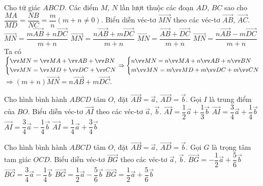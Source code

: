 \begin{ex}%
	Cho tứ giác $ABCD$. Các điểm $M,\,N$ lần lượt thuộc các đoạn $AD,\,BC$ sao cho $\dfrac{MA}{MD}=\dfrac{NB}{NC}=\dfrac{m}{n} (m+n\ne 0)$. Biểu diễn véc-tơ $\vec{MN}$ theo các véc-tơ $\vec{AB},\,\vec{AC}$.
	\haicot
	{$\vec{MN}=\dfrac{m\vec{AB}+n\vec{DC}}{m+n}$}
	{\True $\vec{MN}=\dfrac{n\vec{AB}+m\vec{DC}}{m+n}$}
	{$\vec{MN}=\dfrac{\vec{AB}+\vec{DC}}{m+n}$}
	{$\vec{MN}=\dfrac{n\vec{AB}-m\vec{DC}}{m+n}$}
	\loigiai
	{Ta có $\heva{&\vec{MN}=\vec{MA}+\vec{AB}+\vec{BN}\\&\vec{MN}=\vec{MD}+\vec{DC}+\vec{CN}}\Rightarrow\heva{&n\vec{MN}=n\vec{MA}+n\vec{AB}+n\vec{BN}\\&m\vec{MN}=m\vec{MD}+m\vec{DC}+m\vec{CN}}$\\
		$\Rightarrow (m+n)\vec{MN}=n\vec{AB}+m\vec{DC}.$}
\end{ex}

\begin{ex}%
	Cho hình bình hành $ABCD$ tâm $O$, đặt $\vec{AB}=\vec{a},\,\vec{AD}=\vec{b}.$ Gọi $I$ là trung điểm của $BO$.  Biểu diễn véc-tơ $\vec{AI}$ theo các véc-tơ $\vec{a},\,\vec{b}$.
	\haicot
	{$\vec{AI}=\dfrac{1}{2}\vec{a}+\dfrac{1}{3}\vec{b}$}
	{\True $\vec{AI}=\dfrac{3}{4}\vec{a}+\dfrac{1}{4}\vec{b}$}
	{$\vec{AI}=\dfrac{3}{4}\vec{a}-\dfrac{1}{4}\vec{b}$}
	{$\vec{AI}=\dfrac{1}{4}\vec{a}+\dfrac{3}{4}\vec{b}$}
\end{ex}

\begin{ex}%
	Cho hình bình hành $ABCD$ tâm $O$, đặt $\vec{AB}=\vec{a},\,\vec{AD}=\vec{b}.$ Gọi $G$ là trọng tâm tam giác $OCD$.  Biểu diễn véc-tơ $\vec{BG}$ theo các véc-tơ $\vec{a},\,\vec{b}$.
	\haicot
	{\True $\vec{BG}=-\dfrac{1}{2}\vec{a}+\dfrac{5}{6}\vec{b}$}
	{ $\vec{BG}=\dfrac{3}{4}\vec{a}-\dfrac{1}{4}\vec{b}$}
	{$\vec{BG}=\dfrac{1}{2}\vec{a}-\dfrac{5}{6}\vec{b}$}
	{$\vec{BG}=\dfrac{1}{2}\vec{a}+\dfrac{5}{6}\vec{b}$}
\end{ex}

